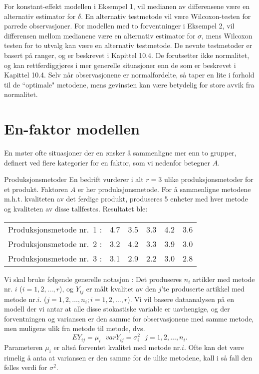 For konstant-effekt modellen i Eksempel 1, vil medianen av differensene
være en alternativ estimator for $\delta$.  En alternativ 
testmetode vil være Wilcoxon-testen for parrede observasjoner.  For
modellen med to forventninger i Eksempel 2, vil differensen mellom
medianene være en alternativ estimator for ${\sigma}$, mens
Wilcoxon testen for to utvalg kan være en alternativ testmetode.
De nevnte testmetoder er basert på ranger, og er beskrevet i
Kapittel 10.4.  De forutsetter ikke normalitet, og kan rettferdiggjøres
i mer generelle situasjoner enn de som er beskrevet i Kapittel 10.4.  
Selv når observasjonene er normalfordelte, så taper en lite i
forhold til de ``optimale" metodene, mens gevinsten kan være betydelig
for store avvik fra normalitet.

\section{En-faktor modellen}
En møter ofte situasjoner der en ønsker å sammenligne mer enn to
grupper, definert ved flere kategorier for en faktor, som vi nedenfor
betegner $A$.\\

\begin{eksempel}{Produksjonsmetoder}
En bedrift vurderer i alt $r=3$ ulike produksjonsmetoder for et produkt.
Faktoren $A$ er her produksjonsmetode. 
For å sammenligne metodene m.h.t. kvaliteten av det ferdige produkt,
produseres 5 enheter med hver metode og kvaliteten av disse tallfestes. 
Resultatet ble:

\begin{tabular}{lccccc}
Produksjonsmetode nr.~1 : & 4.7 & 3.5 & 3.3 & 4.2 & 3.6 \\
Produksjonsmetode nr.~2 : & 3.2 & 4.2 & 3.3 & 3.9 & 3.0 \\
Produksjonsmetode nr.~3 : & 3.1 & 2.9 & 2.2 & 3.0 & 2.8
\end{tabular}
\end{eksempel}%

Vi skal bruke følgende generelle notasjon : Det produseres $n_i$ artikler 
med metode nr. $i$ ($i = 1, 2, \ldots, r$), og $Y_{ij}$ er målt
kvalitet av den $j$'te produserte artikkel med metode nr.$i$. 
($j = 1, 2,\ldots, n_i; i = 1, 2, \ldots, r$).
Vi vil basere dataanalysen på en modell der vi antar at alle disse
stokastiske variable er uavhengige, og der forventningen og 
variansen er den samme for observasjonene med samme metode, men
muligens ulik fra metode til metode, dvs.
\[ EY_{ij} = {\mu}_i \mbox{\ \ \ \ } varY_{ij} = {\sigma}_i^2 \mbox{\ \ }
                                              j = 1, 2, \ldots, n_i. \]
Parameteren ${\mu}_i$ er altså forventet kvalitet med metode nr.$i$.
Ofte kan det være rimelig å anta at variansen er den samme for 
de ulike metodene, kall i så fall den felles verdi for ${\sigma}^2$.

